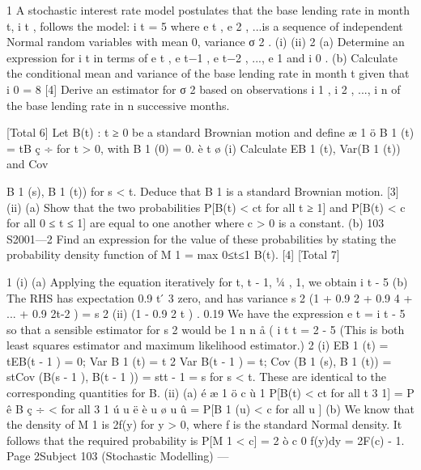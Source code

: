 1
A stochastic interest rate model postulates that the base lending rate in month t,
i t , follows the model:
i t = 5%
where e t , e 2 , ...is a sequence of independent Normal random variables with mean
0, variance σ 2 .
(i)
(ii)
2
(a) Determine an expression for i t in terms of e t , e t−1 , e t−2 , ..., e 1 and i 0 .
(b) Calculate the conditional mean and variance of the base lending
rate in month t given that i 0 = 8%
[4]
Derive an estimator for σ 2 based on observations i 1 , i 2 , ..., i n of the base
lending rate in n successive months.

[Total 6]
Let {B(t) : t ≥ 0} be a standard Brownian motion and define
æ 1 ö
B 1 (t) = tB ç ÷ for t > 0, with B 1 (0) = 0.
è t ø
(i) Calculate EB 1 (t), Var(B 1 (t)) and Cov{B 1 (s), B 1 (t)) for s < t. Deduce that B 1
is a standard Brownian motion.
[3]
(ii) (a)
Show that the two probabilities
P[B(t) < ct for all t ≥ 1]
and
P[B(t) < c for all 0 ≤ t ≤ 1]
are equal to one another where c > 0 is a constant.
(b)
103 S2001—2
Find an expression for the value of these probabilities by stating
the probability density function of M 1 = max 0≤t≤1 B(t).
[4]
[Total 7]

1
(i)
(a) Applying the equation iteratively for t, t - 1, 1⁄4 , 1, we obtain
i t - 5%
(b) The RHS has expectation 0.9 t  ́ 3%
zero, and has variance s 2 (1 + 0.9 2 + 0.9 4 + ... + 0.9 2t-2 ) = s 2
(ii)
(1 - 0.9 2 t )
.
0.19
We have the expression
e t = i t - 5%
so that a sensible estimator for s 2 would be
1
n
n
å ( i
t
t = 2
- 5%
(This is both least squares estimator and maximum likelihood estimator.)
2
(i)
EB 1 (t) = tEB(t - 1 ) = 0;
Var B 1 (t) = t 2 Var B(t - 1 ) = t;
Cov (B 1 (s), B 1 (t)) = stCov (B(s - 1 ), B(t - 1 )) = stt - 1 = s for s < t.
These are identical to the corresponding quantities for B.
(ii)
(a)
é æ 1 ö c
ù
1
P[B(t) < ct for all t 3 1] = P ê B ç ÷ < for all 3 1 ú
u
ë è u ø u
û
= P[B 1 (u) < c for all u ]
(b)
We know that the density of M 1 is 2f(y) for y > 0, where f is the
standard Normal density.
It follows that the required probability is
P[M 1 < c] = 2 ò c 0 f(y)dy = 2F(c) - 1.
Page 2Subject 103 (Stochastic Modelling) — 

}
